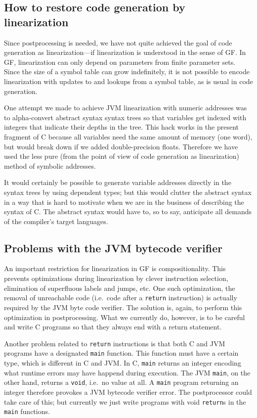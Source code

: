 \documentclass[12pt]{article}
\begin{document}
\subsection{How to restore code generation by linearization}

Since postprocessing is needed, we have not quite achieved
the goal of code generation as linearization---if
linearization is understood in the
sense of GF. In GF, linearization can only depend 
on parameters from finite parameter sets. Since the size of
a symbol table can grow indefinitely, it is not 
possible to encode linearization with updates to and 
lookups from a symbol table, as is usual in code generation. 

One attempt we made to achieve JVM linearization with
numeric addresses was to alpha-convert abstract syntax syntax trees
so that variables get indexed with integers that indicate their 
depths in the tree. This hack works in the present fragment of C
because all variables need the same amount of memory (one word), 
but would break down if we added double-precision floats. Therefore
we have used the less pure (from the point of view of
code generation as linearization) method of
symbolic addresses.

It would certainly be possible to generate variable addresses
directly in the syntax trees by using dependent types; but this 
would clutter the abstract
syntax in a way that is hard to motivate when we are in
the business of describing the syntax of C. The abstract syntax would
have to, so to say, anticipate all demands of the compiler's
target languages. 


\subsection{Problems with the JVM bytecode verifier}

An important restriction for linearization in GF is compositionality.
This prevents optimizations during linearization
by clever instruction selection, elimination of superfluous
labels and jumps, etc. One such optimization, the removal
of unreachable code (i.e.\ code after a \texttt{return} instruction)
is actually required by the JVM byte code verifier.
The solution is, again, to perform this optimization in postprocessing.
What we currently do, however, is to be careful and write
C programs so that they always end with a return statement.

Another problem related to \texttt{return} instructions is that
both C and JVM programs have a designated \texttt{main} function.
This function must have a certain type, which is different in C and
JVM. In C, \texttt{main} returns an integer encoding what runtime
errors may have happend during execution. The JVM 
\texttt{main}, on the other hand, returns a \texttt{void}, i.e.\
no value at all. A \texttt{main} program returning an
integer therefore provokes a JVM bytecode verifier error.
The postprocessor could take care of this; but currently
we just write programs with void \texttt{return}s in the 
\texttt{main} functions.
\end{document}
